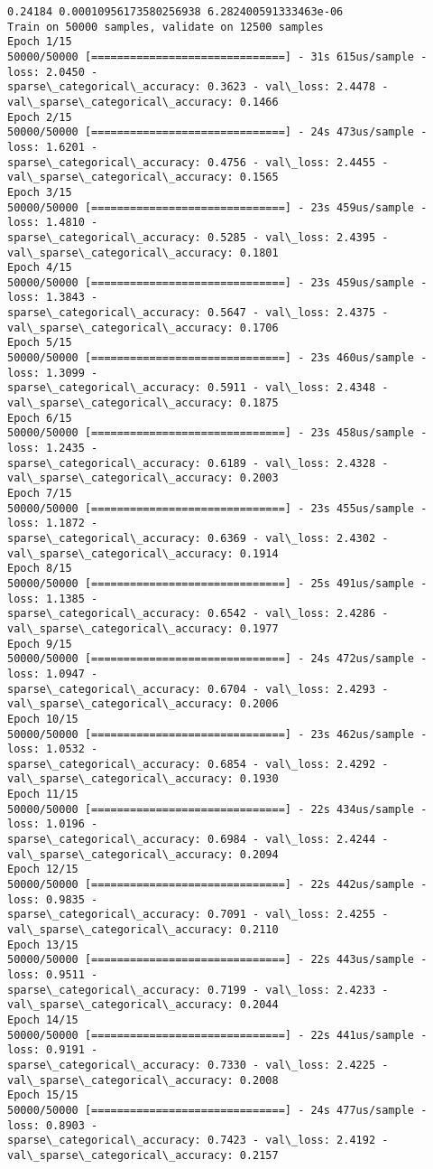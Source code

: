 \documentclass[11pt]{article}
\begin{document}
    \begin{Verbatim}[commandchars=\\\{\}]
0.24184 0.00010956173580256938 6.282400591333463e-06
Train on 50000 samples, validate on 12500 samples
Epoch 1/15
50000/50000 [==============================] - 31s 615us/sample - loss: 2.0450 -
sparse\_categorical\_accuracy: 0.3623 - val\_loss: 2.4478 -
val\_sparse\_categorical\_accuracy: 0.1466
Epoch 2/15
50000/50000 [==============================] - 24s 473us/sample - loss: 1.6201 -
sparse\_categorical\_accuracy: 0.4756 - val\_loss: 2.4455 -
val\_sparse\_categorical\_accuracy: 0.1565
Epoch 3/15
50000/50000 [==============================] - 23s 459us/sample - loss: 1.4810 -
sparse\_categorical\_accuracy: 0.5285 - val\_loss: 2.4395 -
val\_sparse\_categorical\_accuracy: 0.1801
Epoch 4/15
50000/50000 [==============================] - 23s 459us/sample - loss: 1.3843 -
sparse\_categorical\_accuracy: 0.5647 - val\_loss: 2.4375 -
val\_sparse\_categorical\_accuracy: 0.1706
Epoch 5/15
50000/50000 [==============================] - 23s 460us/sample - loss: 1.3099 -
sparse\_categorical\_accuracy: 0.5911 - val\_loss: 2.4348 -
val\_sparse\_categorical\_accuracy: 0.1875
Epoch 6/15
50000/50000 [==============================] - 23s 458us/sample - loss: 1.2435 -
sparse\_categorical\_accuracy: 0.6189 - val\_loss: 2.4328 -
val\_sparse\_categorical\_accuracy: 0.2003
Epoch 7/15
50000/50000 [==============================] - 23s 455us/sample - loss: 1.1872 -
sparse\_categorical\_accuracy: 0.6369 - val\_loss: 2.4302 -
val\_sparse\_categorical\_accuracy: 0.1914
Epoch 8/15
50000/50000 [==============================] - 25s 491us/sample - loss: 1.1385 -
sparse\_categorical\_accuracy: 0.6542 - val\_loss: 2.4286 -
val\_sparse\_categorical\_accuracy: 0.1977
Epoch 9/15
50000/50000 [==============================] - 24s 472us/sample - loss: 1.0947 -
sparse\_categorical\_accuracy: 0.6704 - val\_loss: 2.4293 -
val\_sparse\_categorical\_accuracy: 0.2006
Epoch 10/15
50000/50000 [==============================] - 23s 462us/sample - loss: 1.0532 -
sparse\_categorical\_accuracy: 0.6854 - val\_loss: 2.4292 -
val\_sparse\_categorical\_accuracy: 0.1930
Epoch 11/15
50000/50000 [==============================] - 22s 434us/sample - loss: 1.0196 -
sparse\_categorical\_accuracy: 0.6984 - val\_loss: 2.4244 -
val\_sparse\_categorical\_accuracy: 0.2094
Epoch 12/15
50000/50000 [==============================] - 22s 442us/sample - loss: 0.9835 -
sparse\_categorical\_accuracy: 0.7091 - val\_loss: 2.4255 -
val\_sparse\_categorical\_accuracy: 0.2110
Epoch 13/15
50000/50000 [==============================] - 22s 443us/sample - loss: 0.9511 -
sparse\_categorical\_accuracy: 0.7199 - val\_loss: 2.4233 -
val\_sparse\_categorical\_accuracy: 0.2044
Epoch 14/15
50000/50000 [==============================] - 22s 441us/sample - loss: 0.9191 -
sparse\_categorical\_accuracy: 0.7330 - val\_loss: 2.4225 -
val\_sparse\_categorical\_accuracy: 0.2008
Epoch 15/15
50000/50000 [==============================] - 24s 477us/sample - loss: 0.8903 -
sparse\_categorical\_accuracy: 0.7423 - val\_loss: 2.4192 -
val\_sparse\_categorical\_accuracy: 0.2157
    \end{Verbatim}
\end{document}
